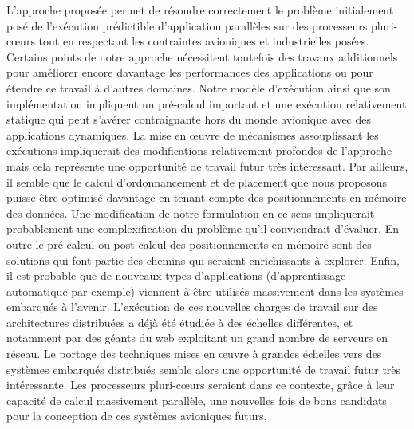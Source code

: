 \documentclass[main.tex]{subfiles}
\begin{document}
L'approche proposée permet de résoudre correctement le problème initialement posé de l'exécution prédictible d'application parallèles sur des processeurs pluri-c\oe{}urs tout en respectant les contraintes avioniques et industrielles posées. Certains points de notre approche nécessitent toutefois des travaux additionnels pour améliorer encore davantage les performances des applications ou pour étendre ce travail à d'autres domaines.
Notre modèle d'exécution ainsi que son implémentation impliquent un pré-calcul important et une exécution relativement statique qui peut s'avérer contraignante hors du monde avionique avec des applications dynamiques. La mise en \oe{}uvre de mécanismes assouplissant les exécutions impliquerait des modifications relativement profondes de l'approche mais cela représente une opportunité de travail futur très intéressant. Par ailleurs, il semble que le calcul d'ordonnancement et de placement que nous proposons puisse être optimisé davantage en tenant compte des positionnements en mémoire des données. Une modification de notre formulation en ce sens impliquerait probablement une complexification du problème qu'il conviendrait d'évaluer. En outre le pré-calcul ou post-calcul des positionnements en mémoire sont des solutions qui font partie des chemins qui seraient enrichissants à explorer. Enfin, il est probable que de nouveaux types d'applications (d'apprentissage automatique par exemple) viennent à être utilisés massivement dans les systèmes embarqués à l'avenir. L'exécution de ces nouvelles charges de travail sur des architectures distribuées a déjà été étudiée à des échelles différentes, et notamment par des géants du web exploitant un grand nombre de serveurs en réseau. Le portage des techniques mises en \oe{}uvre à grandes échelles vers des systèmes embarqués distribués semble alors une opportunité de travail futur très intéressante. Les processeurs pluri-c\oe{}urs seraient dans ce contexte, grâce à leur capacité de calcul massivement parallèle, une nouvelles fois de bons candidats pour la conception de ces systèmes avioniques futurs.

\clearpage

\subbiblio
\end{document}
